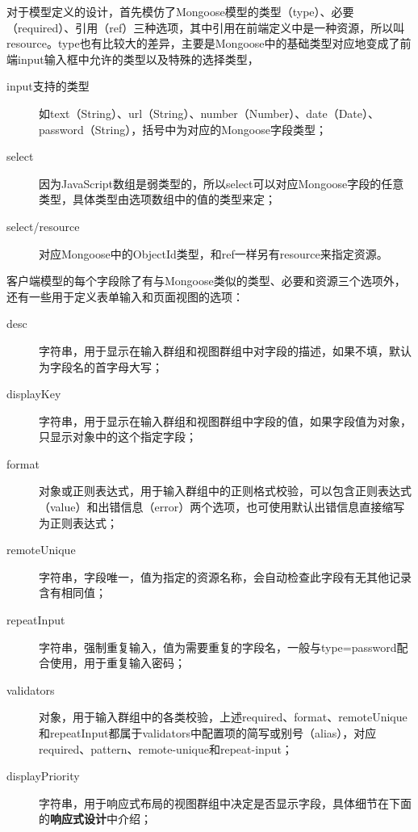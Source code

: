 对于模型定义的设计，首先模仿了Mongoose模型的类型（type）、必要（required）、引用（ref）三种选项，其中引用在前端定义中是一种资源，所以叫resource。type也有比较大的差异，主要是Mongoose中的基础类型对应地变成了前端input输入框中允许的类型以及特殊的选择类型，
\begin{description}
  \item[input支持的类型] 如text（String）、url（String）、number（Number）、date（Date）、password（String），括号中为对应的Mongoose字段类型；
  \item[select] 因为JavaScript数组是弱类型的，所以select可以对应Mongoose字段的任意类型，具体类型由选项数组中的值的类型来定；
  \item[select/resource] 对应Mongoose中的ObjectId类型，和ref一样另有resource来指定资源。
\end{description}

客户端模型的每个字段除了有与Mongoose类似的类型、必要和资源三个选项外，还有一些用于定义表单输入和页面视图的选项：
\begin{description}
  \item[desc] 字符串，用于显示在输入群组和视图群组中对字段的描述，如果不填，默认为字段名的首字母大写；
  \item[displayKey] 字符串，用于显示在输入群组和视图群组中字段的值，如果字段值为对象，只显示对象中的这个指定字段；
  \item[format] 对象或正则表达式，用于输入群组中的正则格式校验，可以包含正则表达式（value）和出错信息（error）两个选项，也可使用默认出错信息直接缩写为正则表达式；
  \item[remoteUnique] 字符串，字段唯一，值为指定的资源名称，会自动检查此字段有无其他记录含有相同值；
  \item[repeatInput] 字符串，强制重复输入，值为需要重复的字段名，一般与type=password配合使用，用于重复输入密码；
  \item[validators] 对象，用于输入群组中的各类校验，上述required、format、remoteUnique和repeatInput都属于validators中配置项的简写或别号（alias），对应required、pattern、remote-unique和repeat-input；
  \item[displayPriority] 字符串，用于响应式布局的视图群组中决定是否显示字段，具体细节在下面的\textbf{响应式设计}中介绍；
\end{description}

